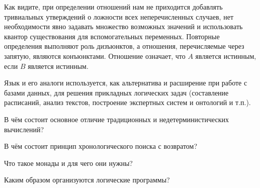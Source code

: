 Как видите, при определении отношений нам не приходится добавлять тривиальных утверждений о ложности всех неперечисленных случаев, нет необходимости явно задавать множество возможных значений и использовать квантор существования для вспомогательных переменных. Повторные определения выполняют роль дизъюнктов, а отношения, перечисляемые через запятую, являются конъюнктами. Отношение   означает, что $A$ является истинным, если $B$ является истинным.

Язык  и его аналоги используется, как альтернатива и расширение  при работе с базами данных, для решения прикладных логических задач (составление расписаний, анализ текстов, построение экспертных систем и онтологий и т.п.).

\begin{Queeze}
 \item В чём состоит основное отличие традиционных и недетерминистических вычислений?
 \item В чём состоит принцип хронологического поиска с возвратом?
 \item Что такое монады и для чего они нужны? 
 \item Каким образом организуются логические программы?
\end{Queeze}
